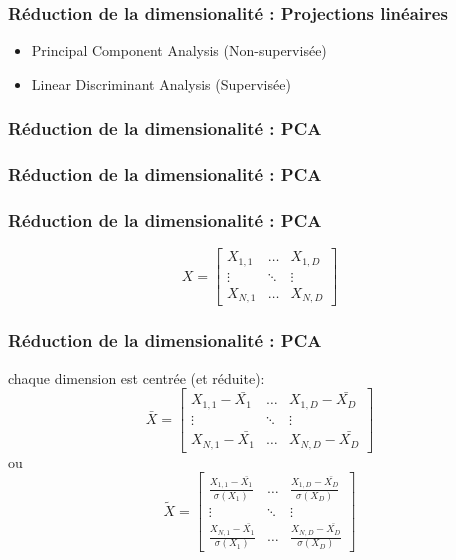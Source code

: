 \begin{frame}
  \frametitle{Réduction de la dimensionalité : Projections linéaires}
    \begin{itemize}
    \item Principal Component Analysis (Non-supervisée)
    \item Linear Discriminant Analysis (Supervisée)
    \end{itemize}
\end{frame}

\begin{frame}
  \frametitle{Réduction de la dimensionalité : PCA}
\end{frame}

\begin{frame}
  \frametitle{Réduction de la dimensionalité : PCA}
\end{frame}

\begin{frame}
  \frametitle{Réduction de la dimensionalité : PCA}
  \[
  X = \begin{bmatrix}
    X_{1,1} & \dots  & X_{1,D} \\
    \vdots & \ddots & \vdots \\
    X_{N,1} & \dots  & X_{N,D}
  \end{bmatrix}
  \]
\end{frame}

\begin{frame}
  \frametitle{Réduction de la dimensionalité : PCA}
  chaque dimension est centrée (et réduite):
  \[
  \bar{X} =
  \begin{bmatrix}
    X_{1,1}-\bar{X_1} & \dots  & X_{1,D}-\bar{X_D} \\
    \vdots & \ddots & \vdots \\
    X_{N,1}-\bar{X_1} & \dots  & X_{N,D}-\bar{X_D}
  \end{bmatrix}
  \]
  ou
  \[
  \tilde{X} =
  \begin{bmatrix}
    \frac{X_{1,1}-\bar{X_1}}{\sigma(X_1)} & \dots  & \frac{X_{1,D}-\bar{X_D}}{\sigma(X_D)} \\
    \vdots & \ddots & \vdots \\
    \frac{X_{N,1}-\bar{X_1}}{\sigma(X_1)} & \dots  & \frac{X_{N,D}-\bar{X_D}}{\sigma(X_D)}
  \end{bmatrix}
  \]
\end{frame}

